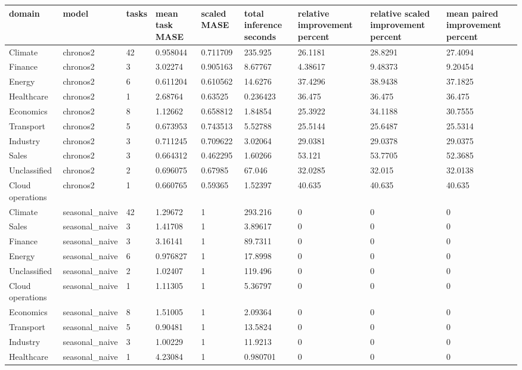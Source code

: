 \begin{tabular}{lllllllll}
\toprule
domain & model & tasks & mean task MASE & scaled MASE & total inference seconds & relative improvement percent & relative scaled improvement percent & mean paired improvement percent \\
\midrule
Climate & chronos2 & 42 & 0.958044 & 0.711709 & 235.925 & 26.1181 & 28.8291 & 27.4094 \\
Finance & chronos2 & 3 & 3.02274 & 0.905163 & 8.67767 & 4.38617 & 9.48373 & 9.20454 \\
Energy & chronos2 & 6 & 0.611204 & 0.610562 & 14.6276 & 37.4296 & 38.9438 & 37.1825 \\
Healthcare & chronos2 & 1 & 2.68764 & 0.63525 & 0.236423 & 36.475 & 36.475 & 36.475 \\
Economics & chronos2 & 8 & 1.12662 & 0.658812 & 1.84854 & 25.3922 & 34.1188 & 30.7555 \\
Transport & chronos2 & 5 & 0.673953 & 0.743513 & 5.52788 & 25.5144 & 25.6487 & 25.5314 \\
Industry & chronos2 & 3 & 0.711245 & 0.709622 & 3.02064 & 29.0381 & 29.0378 & 29.0375 \\
Sales & chronos2 & 3 & 0.664312 & 0.462295 & 1.60266 & 53.121 & 53.7705 & 52.3685 \\
Unclassified & chronos2 & 2 & 0.696075 & 0.67985 & 67.046 & 32.0285 & 32.015 & 32.0138 \\
Cloud operations & chronos2 & 1 & 0.660765 & 0.59365 & 1.52397 & 40.635 & 40.635 & 40.635 \\
Climate & seasonal\_naive & 42 & 1.29672 & 1 & 293.216 & 0 & 0 & 0 \\
Sales & seasonal\_naive & 3 & 1.41708 & 1 & 3.89617 & 0 & 0 & 0 \\
Finance & seasonal\_naive & 3 & 3.16141 & 1 & 89.7311 & 0 & 0 & 0 \\
Energy & seasonal\_naive & 6 & 0.976827 & 1 & 17.8998 & 0 & 0 & 0 \\
Unclassified & seasonal\_naive & 2 & 1.02407 & 1 & 119.496 & 0 & 0 & 0 \\
Cloud operations & seasonal\_naive & 1 & 1.11305 & 1 & 5.36797 & 0 & 0 & 0 \\
Economics & seasonal\_naive & 8 & 1.51005 & 1 & 2.09364 & 0 & 0 & 0 \\
Transport & seasonal\_naive & 5 & 0.90481 & 1 & 13.5824 & 0 & 0 & 0 \\
Industry & seasonal\_naive & 3 & 1.00229 & 1 & 11.9213 & 0 & 0 & 0 \\
Healthcare & seasonal\_naive & 1 & 4.23084 & 1 & 0.980701 & 0 & 0 & 0 \\
\bottomrule
\end{tabular}
